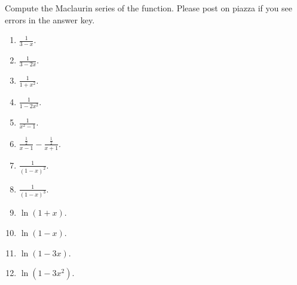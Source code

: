 Compute the Maclaurin series of the function. Please post on piazza if you see errors in the answer key.
\begin{multicols}{2}
\begin{enumerate}[ref={\fcProblemRef}]
\item $\displaystyle \frac{1}{3-x}$.

\item $\displaystyle \frac{1}{3-2x}$.


\item $\displaystyle \frac{1}{1+x^2}$.


\item $\displaystyle \frac{1}{1-2x^2}$.

\item $\displaystyle \frac{1}{x^2-1}$. \label{problemMaclaurin(1/(x^2-1))}

\item $\displaystyle\frac{\frac12}{x-1}-\frac{\frac12}{x+1}$.

\item $\displaystyle \frac{1}{(1-x)^2}$.

\item $\displaystyle \frac{1}{(1-x)^3}$.

\item $\displaystyle\ln (1+x)$.

\item $\ln (1-x)$.

\item $\ln (1-3x)$.

\item $\ln (1-3x^2)$.



\end{enumerate}
\end{multicols}
